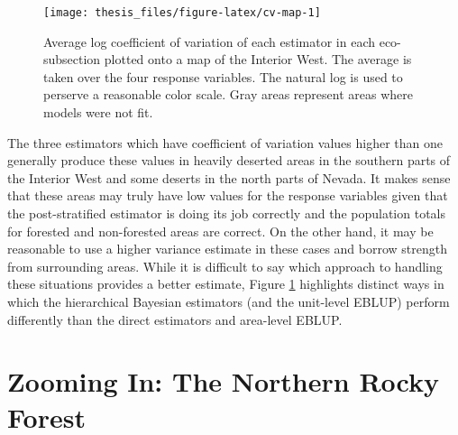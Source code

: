 \documentclass[12pt,twoside]{reedthesis}
\begin{document}
\clearpage
\begin{figure}

{\centering \texttt{[image: thesis\_files/figure-latex/cv-map-1]} 

}

\caption[Coefficient of variation map]{Average log coefficient of variation of each estimator in each eco-subsection plotted onto a map of the Interior West. The average is taken over the four response variables. The natural log is used to perserve a reasonable color scale. Gray areas represent areas where models were not fit.}\label{fig:cv-map}
\end{figure}
The three estimators which have coefficient of variation values higher than one generally produce these values in heavily deserted areas in the southern parts of the Interior West and some deserts in the north parts of Nevada. It makes sense that these areas may truly have low values for the response variables given that the post-stratified estimator is doing its job correctly and the population totals for forested and non-forested areas are correct. On the other hand, it may be reasonable to use a higher variance estimate in these cases and borrow strength from surrounding areas. While it is difficult to say which approach to handling these situations provides a better estimate, Figure \ref{fig:cv-map} highlights distinct ways in which the hierarchical Bayesian estimators (and the unit-level EBLUP) perform differently than the direct estimators and area-level EBLUP.
\clearpage

\hypertarget{zooming-in-the-northern-rocky-forest}{%
\section{Zooming In: The Northern Rocky Forest}\label{zooming-in-the-northern-rocky-forest}}
\end{document}
